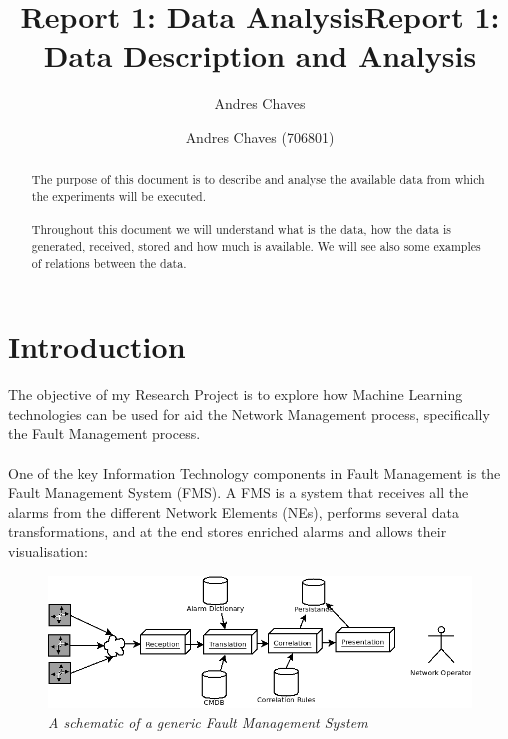 \documentclass[10pt,a4paper]{report}
\author{Andres Chaves}
\title{Report 1: Data Analysis}
\begin{document}
 \title{Report 1: Data Description and Analysis}
 \author{Andres Chaves (706801) \\
  }
 \maketitle

\begin{abstract}
    The purpose of this document is to describe and analyse the available data from which the experiments will be executed.
   \\\\
   Throughout this document we will understand what is the data, how the data is generated, received, stored and how much is available. We will see also some examples of relations between the data.
\end{abstract}

 \chapter*{Introduction}
The objective of my Research Project is to explore how Machine Learning technologies can be used for aid the Network Management process, specifically the Fault Management process. 
\\\\
One of the key Information Technology components in Fault Management is the Fault  Management System (FMS). A FMS is a system that receives all the alarms from the different Network Elements (NEs), performs several data transformations, and at the end stores enriched alarms and allows their visualisation:

\begin{figure}[H]
 \includegraphics[scale=0.4]{../research_proposal/NMS_GeneralDiagram.png}
  \centering
  \caption{\textit{A schematic of a generic Fault Management System}}
  \label{fig:nms_generaldiagram}
\end{figure}	
\end{document}
